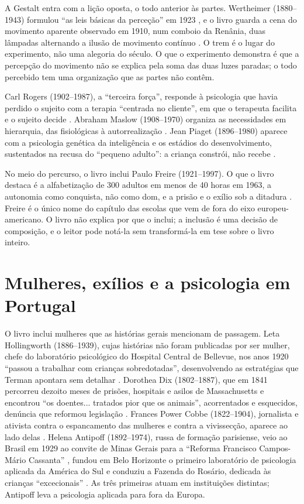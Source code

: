 \documentclass[12pt]{article}
\begin{document}
A Gestalt entra com a lição oposta, o todo anterior às partes. Wertheimer (1880--1943) formulou ``as leis básicas da perceção'' em 1923 \cite[p. 93]{machado}, e o livro guarda a cena do movimento aparente observado em 1910, num comboio da Renânia, duas lâmpadas alternando a ilusão de movimento contínuo \cite[p. 93]{machado}. O trem é o lugar do experimento, não uma alegoria do século. O que o experimento demonstra é que a percepção do movimento não se explica pela soma das duas luzes paradas; o todo percebido tem uma organização que as partes não contêm.

Carl Rogers (1902--1987), a ``terceira força'', responde à psicologia que havia perdido o sujeito com a terapia ``centrada no cliente'', em que o terapeuta facilita e o sujeito decide \cite[p. 81]{machado}. Abraham Maslow (1908--1970) organiza as necessidades em hierarquia, das fisiológicas à autorrealização \cite[p. 88]{machado}. Jean Piaget (1896--1980) aparece com a psicologia genética da inteligência e os estádios do desenvolvimento, sustentados na recusa do ``pequeno adulto'': a criança constrói, não recebe \cite[pp. 74--75]{machado}.

No meio do percurso, o livro inclui Paulo Freire (1921--1997). O que o livro destaca é a alfabetização de 300 adultos em menos de 40 horas em 1963, a autonomia como conquista, não como dom, e a prisão e o exílio sob a ditadura \cite[pp. 77--78]{machado}. Freire é o único nome do capítulo das escolas que vem de fora do eixo europeu-americano. O livro não explica por que o inclui; a inclusão é uma decisão de composição, e o leitor pode notá-la sem transformá-la em tese sobre o livro inteiro.

\section{Mulheres, exílios e a psicologia em Portugal}

O livro inclui mulheres que as histórias gerais mencionam de passagem. Leta Hollingworth (1886--1939), cujas histórias não foram publicadas por ser mulher, chefe do laboratório psicológico do Hospital Central de Bellevue, nos anos 1920 ``passou a trabalhar com crianças sobredotadas'', desenvolvendo as estratégias que Terman apontara sem detalhar \cite[p. 70]{machado}. Dorothea Dix (1802--1887), que em 1841 percorreu dezoito meses de prisões, hospitais e asilos de Massachusetts e encontrou ``os doentes... tratados pior que os animais'', acorrentados e esquecidos, denúncia que reformou legislação \cite[p. 35]{machado}. Frances Power Cobbe (1822--1904), jornalista e ativista contra o espancamento das mulheres e contra a vivissecção, aparece ao lado delas \cite[pp. 26--27]{machado}. Helena Antipoff (1892--1974), russa de formação parisiense, veio ao Brasil em 1929 ao convite de Minas Gerais para a ``Reforma Francisco Campos-Mário Cassanta'' \cite[p. 73]{machado}, fundou em Belo Horizonte o primeiro laboratório de psicologia aplicada da América do Sul e conduziu a Fazenda do Rosário, dedicada às crianças ``excecionais'' \cite[p. 89]{machado}. As três primeiras atuam em instituições distintas; Antipoff leva a psicologia aplicada para fora da Europa.
\end{document}
